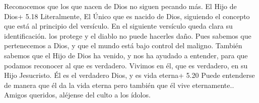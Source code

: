  Reconocemos que los que nacen de Dios no siguen pecando
más. El Hijo de Dios+ 5.18 Literalmente, El Único que es nacido de Dios,
siguiendo el concepto que está al principio del versículo. En el
siguiente versículo queda clara su identificación. los protege y el
diablo no puede hacerles daño.  Pues sabemos que
pertenecemos a Dios, y que el mundo está bajo control del maligno.
 También sabemos que el Hijo de Dios ha venido, y nos ha
ayudado a entender, para que podamos reconocer al que es verdadero.
Vivimos en él, que es verdadero, en su Hijo Jesucristo. Él es el
verdadero Dios, y es vida eterna+ 5.20 Puede entenderse de manera que él
da la vida eterna pero también que él vive eternamente.. 
Amigos queridos, aléjense del culto a los ídolos.
